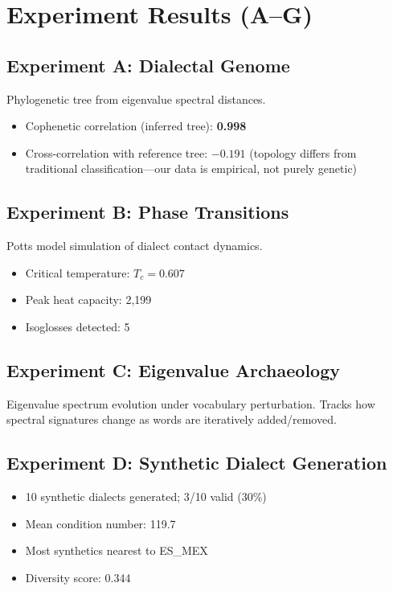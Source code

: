 \documentclass[11pt,a4paper]{article}
\begin{document}
\section{Experiment Results (A--G)}

\subsection{Experiment A: Dialectal Genome}

Phylogenetic tree from eigenvalue spectral distances.

\begin{itemize}[nosep]
\item Cophenetic correlation (inferred tree): \textbf{0.998}
\item Cross-correlation with reference tree: $-0.191$ (topology differs from traditional classification---our data is empirical, not purely genetic)
\end{itemize}

\subsection{Experiment B: Phase Transitions}

Potts model simulation of dialect contact dynamics.

\begin{itemize}[nosep]
\item Critical temperature: $T_c = 0.607$
\item Peak heat capacity: 2{,}199
\item Isoglosses detected: 5
\end{itemize}

\subsection{Experiment C: Eigenvalue Archaeology}

Eigenvalue spectrum evolution under vocabulary perturbation. Tracks how spectral signatures change as words are iteratively added/removed.

\subsection{Experiment D: Synthetic Dialect Generation}

\begin{itemize}[nosep]
\item 10 synthetic dialects generated; 3/10 valid (30\%)
\item Mean condition number: 119.7
\item Most synthetics nearest to ES\_MEX
\item Diversity score: 0.344
\end{itemize}
\end{document}

